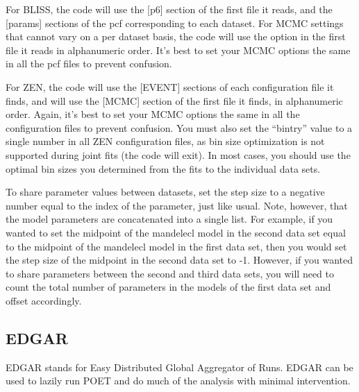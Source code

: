 \documentclass[letterpaper,12pt]{article}
\begin{document}
For BLISS, the code will use the [p6] section of the first file it
reads, and the [params] sections of the pcf corresponding to each
dataset. For MCMC settings that cannot vary on a per dataset basis,
the code will use the option in the first file it reads in
alphanumeric order. It's best to set your MCMC options the same in all
the pcf files to prevent confusion.

For ZEN, the code will use the [EVENT] sections of each configuration
file it finds, and will use the [MCMC] section of the first file it
finds, in alphanumeric order. Again, it's best to set your MCMC
options the same in all the configuration files to prevent confusion.
You must also set the ``bintry'' value to a single number in all ZEN
configuration files, as bin size optimization is not supported during
joint fits (the code will exit). In most cases, you should use the
optimal bin sizes you determined from the fits to the individual data
sets.

To share parameter values between datasets, set the step size to a
negative number equal to the index of the parameter, just like
usual. Note, however, that the model parameters are concatenated into
a single list. For example, if you wanted to set the midpoint of the
mandelecl model in the second data set equal to the midpoint of the
mandelecl model in the first data set, then you would set the step
size of the midpoint in the second data set to -1. However, if you
wanted to share parameters between the second and third data sets, you
will need to count the total number of parameters in the models of the
first data set and offset accordingly.

\subsection{EDGAR}
\label{sec:POE}
EDGAR stands for Easy Distributed Global Aggregator of Runs. EDGAR can
be used to lazily run POET and do much of the analysis with minimal
intervention. 
\end{document}
